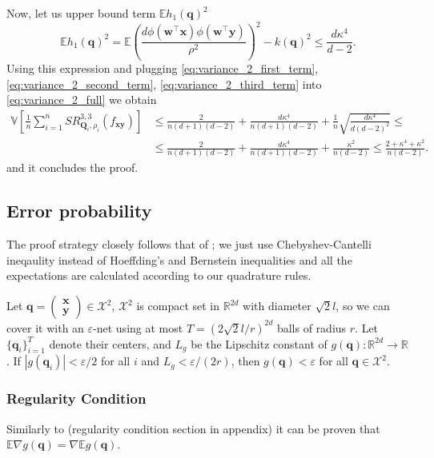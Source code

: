 Now, let us upper bound term $\mathbb{E}h_1(\mathbf{q})^2$
\[
\mathbb{E}h_1(\mathbf{q})^2 =
\mathbb{E}\left ( \frac{d \phi(\mathbf{w}^{\boldsymbol{\top}}\mathbf{x}) \phi(\mathbf{w}^{\boldsymbol{\top}}\mathbf{y})}{\rho^2} \right )^2
- k(\mathbf{q})^2 \le \frac{d \kappa^4}{d - 2}.
\]
Using this expression and plugging \eqref{eq:variance_2_first_term}, \eqref{eq:variance_2_second_term}, \eqref{eq:variance_2_third_term}
into \eqref{eq:variance_2_full} we obtain
\begin{align}
\label{eq:variance_2_upper_bound}
\mathbb{V} \left [
\frac{1}{n}\sum_{i = 1}^nSR^{3, 3}_{\mathbf{Q}_i,\rho_i}(f_{\mathbf{xy}})
\right ] &\le \frac{2}{n(d + 1)(d - 2)} + \frac{d\kappa^4}{n(d + 1)(d - 2)} +
\frac{1}{n}\sqrt{\frac{d\kappa^4}{d(d - 2)^2}} \le \nonumber \\
&\le \frac{2}{n(d + 1)(d - 2)} + \frac{d\kappa^4}{n(d + 1)(d - 2)} +
\frac{\kappa^2}{n(d - 2)} \le \frac{2 + \kappa^4 + \kappa^2}{n(d - 2)}.
\end{align}
and it concludes the proof.

\subsection{Error probability}
The proof strategy closely follows that of \citep{sutherland2015error}; we just use Chebyshev-Cantelli ineqaulity
instead of Hoeffding's and Bernstein inequalities and all the expectations are calculated according to our quadrature rules.

Let $\mathbf{q} = \begin{pmatrix} \mathbf{x} \\ \mathbf{y} \end{pmatrix} \in \mathcal{X}^2$,
$\mathcal{X}^2$ is compact set in $\mathbb{R}^{2d}$ with diameter $\sqrt{2}l$, so we can cover it with an
$\varepsilon$-net using at most $T = (2\sqrt{2}l/r)^{2d}$ balls of radius $r$.
Let $\{\mathbf{q}_i\}_{i=1}^T$ denote their centers, and $L_g$ be the Lipschitz constant of $g(\mathbf{q}): \mathbb{R}^{2d} \rightarrow \mathbb{R}$.
If $|g(\mathbf{q}_i)| < \varepsilon / 2$ for all $i$ and $L_g < \varepsilon / (2r)$, then $g(\mathbf{q}) < \varepsilon$ for all
$\mathbf{q} \in \mathcal{X}^2$.

\subsubsection{Regularity Condition}
Similarly to \citep{sutherland2015error} (regularity condition section in appendix) it can be proven
that $\mathbb{E}\nabla g(\mathbf{q}) = \nabla \mathbb{E}g(\mathbf{q})$.

